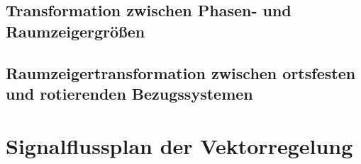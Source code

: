 
\subsection{Transformation zwischen Phasen- und Raumzeigergrößen}

\subsection{Raumzeigertransformation zwischen ortsfesten und rotierenden Bezugssystemen}

\section{Signalflussplan der Vektorregelung}\label{sec:signalflussplan}



